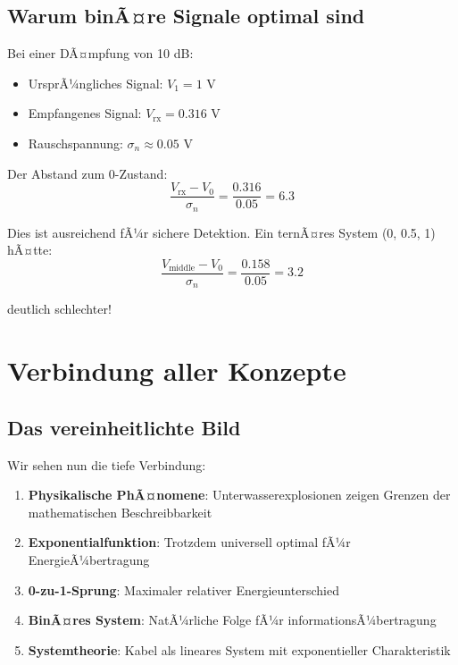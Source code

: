 ﻿\documentclass[12pt,a4paper]{article}
\theoremstyle{definition}
\theoremstyle{remark}
\begin{document}
\subsection{Warum binÃ¤re Signale optimal sind}

Bei einer DÃ¤mpfung von 10 dB:
\begin{itemize}
\item UrsprÃ¼ngliches Signal: $V_1 = 1$ V
\item Empfangenes Signal: $V_{\text{rx}} = 0.316$ V
\item Rauschspannung: $\sigma_n \approx 0.05$ V
\end{itemize}

Der Abstand zum 0-Zustand:
\begin{equation}
\frac{V_{\text{rx}} - V_0}{\sigma_n} = \frac{0.316}{0.05} = 6.3
\end{equation}

Dies ist ausreichend fÃ¼r sichere Detektion. Ein ternÃ¤res System (0, 0.5, 1) hÃ¤tte:
\begin{equation}
\frac{V_{\text{middle}} - V_0}{\sigma_n} = \frac{0.158}{0.05} = 3.2
\end{equation}

deutlich schlechter!

\section{Verbindung aller Konzepte}

\subsection{Das vereinheitlichte Bild}

Wir sehen nun die tiefe Verbindung:

\begin{enumerate}
\item \textbf{Physikalische PhÃ¤nomene}: Unterwasserexplosionen zeigen Grenzen der mathematischen Beschreibbarkeit
\item \textbf{Exponentialfunktion}: Trotzdem universell optimal fÃ¼r EnergieÃ¼bertragung
\item \textbf{0-zu-1-Sprung}: Maximaler relativer Energieunterschied
\item \textbf{BinÃ¤res System}: NatÃ¼rliche Folge fÃ¼r informationsÃ¼bertragung
\item \textbf{Systemtheorie}: Kabel als lineares System mit exponentieller Charakteristik
\end{enumerate}
\end{document}
